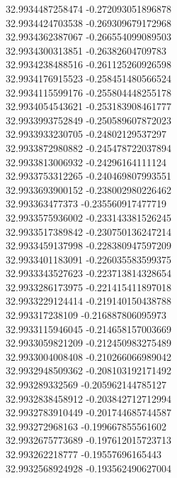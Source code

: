 {32.9934487258474	-0.272093051896878\\
32.9934424703538	-0.269309679172968\\
32.9934362387067	-0.266554099089503\\
32.9934300313851	-0.26382604709783\\
32.9934238488516	-0.261125260926598\\
32.9934176915523	-0.258451480566524\\
32.9934115599176	-0.255804448255178\\
32.9934054543621	-0.253183908461777\\
32.9933993752849	-0.250589607872023\\
32.9933933230705	-0.24802129537297\\
32.9933872980882	-0.245478722037894\\
32.9933813006932	-0.24296164111124\\
32.9933753312265	-0.240469807993551\\
32.9933693900152	-0.238002980226462\\
32.993363477373	-0.235560917477719\\
32.9933575936002	-0.233143381526245\\
32.9933517389842	-0.230750136247214\\
32.9933459137998	-0.228380947597209\\
32.9933401183091	-0.226035583599375\\
32.9933343527623	-0.223713814328654\\
32.9933286173975	-0.221415411897018\\
32.9933229124414	-0.219140150438788\\
32.993317238109	-0.216887806095973\\
32.9933115946045	-0.214658157003669\\
32.9933059821209	-0.212450983275489\\
32.9933004008408	-0.210266066989042\\
32.9932948509362	-0.208103192171492\\
32.993289332569	-0.205962144785127\\
32.9932838458912	-0.203842712712994\\
32.9932783910449	-0.201744685744587\\
32.993272968163	-0.199667855561602\\
32.9932675773689	-0.197612015723713\\
32.993262218777	-0.19557696165443\\
32.9932568924928	-0.193562490627004\\
}
